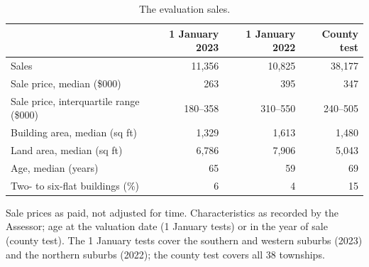 \begin{table}[htbp]
\centering\small
\caption{The evaluation sales.}\label{tab:data}
\begin{tabular}{@{}lrrr@{}}
\toprule
 & 1 January 2023 & 1 January 2022 & County test \\
\midrule
Sales & 11,356 & 10,825 & 38,177 \\
Sale price, median (\$000) & 263 & 395 & 347 \\
Sale price, interquartile range (\$000) & 180--358 & 310--550 & 240--505 \\
Building area, median (sq ft) & 1,329 & 1,613 & 1,480 \\
Land area, median (sq ft) & 6,786 & 7,906 & 5,043 \\
Age, median (years) & 65 & 59 & 69 \\
Two- to six-flat buildings (\%) & 6 & 4 & 15 \\
\bottomrule
\end{tabular}
\par\smallskip\footnotesize\raggedright Sale prices as paid, not adjusted for time. Characteristics as recorded by the Assessor; age at the
valuation date (1 January tests) or in the year of sale (county test). The 1 January tests cover the southern and
western suburbs (2023) and the northern suburbs (2022); the county test covers all 38 townships.
\end{table}
